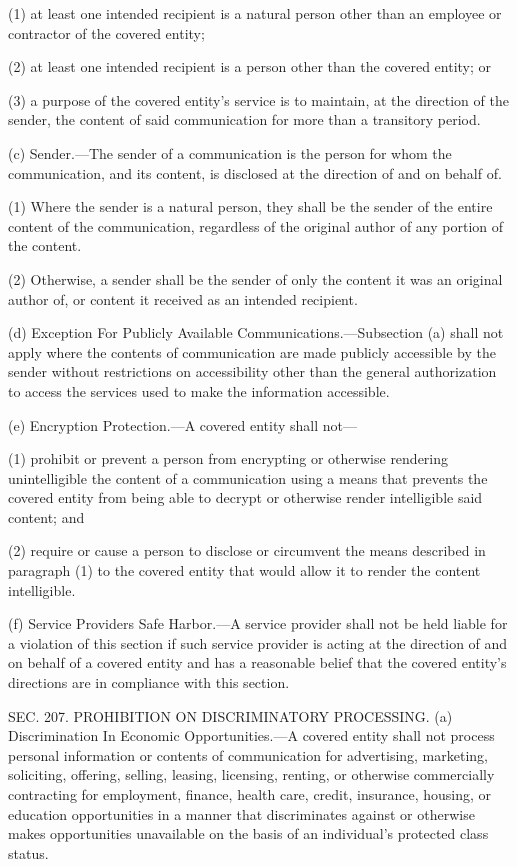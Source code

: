 (1) at least one intended recipient is a natural person other than an employee or contractor of the covered entity;

(2) at least one intended recipient is a person other than the covered entity; or

(3) a purpose of the covered entity’s service is to maintain, at the direction of the sender, the content of said communication for more than a transitory period.

(c) Sender.—The sender of a communication is the person for whom the communication, and its content, is disclosed at the direction of and on behalf of.

(1) Where the sender is a natural person, they shall be the sender of the entire content of the communication, regardless of the original author of any portion of the content.

(2) Otherwise, a sender shall be the sender of only the content it was an original author of, or content it received as an intended recipient.

(d) Exception For Publicly Available Communications.—Subsection (a) shall not apply where the contents of communication are made publicly accessible by the sender without restrictions on accessibility other than the general authorization to access the services used to make the information accessible.

(e) Encryption Protection.—A covered entity shall not—

(1) prohibit or prevent a person from encrypting or otherwise rendering unintelligible the content of a communication using a means that prevents the covered entity from being able to decrypt or otherwise render intelligible said content; and

(2) require or cause a person to disclose or circumvent the means described in paragraph (1) to the covered entity that would allow it to render the content intelligible.

(f) Service Providers Safe Harbor.—A service provider shall not be held liable for a violation of this section if such service provider is acting at the direction of and on behalf of a covered entity and has a reasonable belief that the covered entity’s directions are in compliance with this section.


SEC. 207. PROHIBITION ON DISCRIMINATORY PROCESSING.
(a) Discrimination In Economic Opportunities.—A covered entity shall not process personal information or contents of communication for advertising, marketing, soliciting, offering, selling, leasing, licensing, renting, or otherwise commercially contracting for employment, finance, health care, credit, insurance, housing, or education opportunities in a manner that discriminates against or otherwise makes opportunities unavailable on the basis of an individual’s protected class status.

